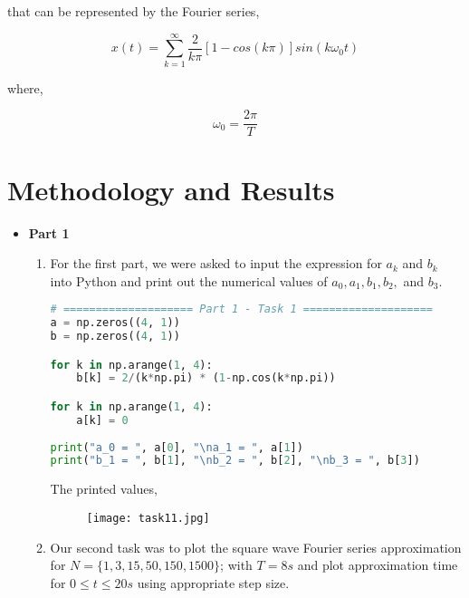 \documentclass[12pt,a4paper]{article}
\begin{document}
that can be represented by the Fourier series,

    $$x(t) = \sum_{k=1}^{\infty} \frac{2}{k\pi} [1-cos(k\pi)]sin(k\omega_{0}t)$$

where,
    
    $$\omega_{0} = \frac{2\pi}{T}$$
\clearpage
\section{Methodology and Results}\label{sec:meth}

\begin{itemize}

\item \textbf{Part 1}\\
\begin{enumerate}

    \item
    For the first part, we were asked to input the expression for $a_{k}$ and $b_{k}$ into Python and print out the numerical values of $a_{0}, a_{1}, b_{1}, b_{2},$ and $ b_{3}.$\\

\begin{lstlisting}[language=Python, caption={Task 1, Part 1}, label={lst:code}, mathescape=true, breaklines=true]
# ==================== Part 1 - Task 1 ====================
a = np.zeros((4, 1))
b = np.zeros((4, 1))

for k in np.arange(1, 4):
    b[k] = 2/(k*np.pi) * (1-np.cos(k*np.pi))

for k in np.arange(1, 4):
    a[k] = 0
    
print("a_0 = ", a[0], "\na_1 = ", a[1])
print("b_1 = ", b[1], "\nb_2 = ", b[2], "\nb_3 = ", b[3])
\end{lstlisting}

The printed values,

\begin{figure}[h]
    \centering
    \texttt{[image: task11.jpg]}
\end{figure}\textbf{}

    \item
    Our second task was to plot the square wave Fourier series approximation for $N = \{1, 3, 15, 50, 150,1500\}$; with $T = 8s$ and plot approximation time for $0 \leq t \leq 20s$ using appropriate step size.\\


\end{enumerate}
\end{itemize}
\end{document}

